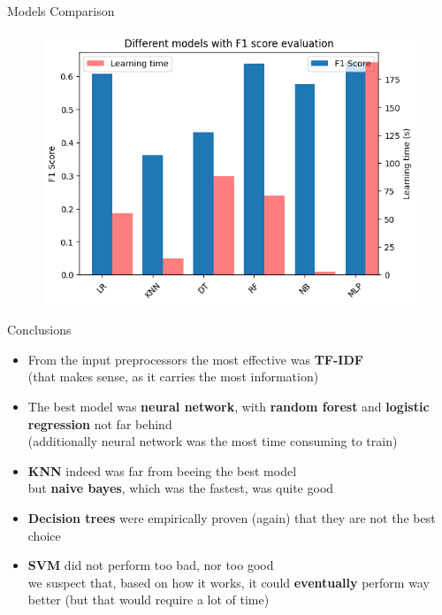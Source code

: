 \documentclass{beamer}
\begin{document}
\begin{frame}[t]{Models Comparison}
	\vspace{-3mm}
	\begin{figure}[h]
		\centering
		\includegraphics[width=0.8\linewidth]{images/models_comparison.png}
	\end{figure}
\end{frame}

\begin{frame}[t]{Conclusions}
\begin{itemize}[<+->]
	\item From the input preprocessors the most effective was {\bf TF-IDF} \\
	(that makes sense, as it carries the most information)
	\item The best model was {\bf neural network}, with {\bf random forest} and {\bf logistic regression} not far behind \\
	(additionally neural network was the most time consuming to train)
	\item {\bf KNN} indeed was far from beeing the best model \\
	but {\bf naive bayes}, which was the fastest, was quite good
	\item {\bf Decision trees} were empirically proven (again) that they are not the best choice
	\item {\bf SVM} did not perform too bad, nor too good \\
	we suspect that, based on how it works, it could {\bf eventually} perform way better (but that would require a lot of time)
\end{itemize}
\end{frame}
\end{document}
